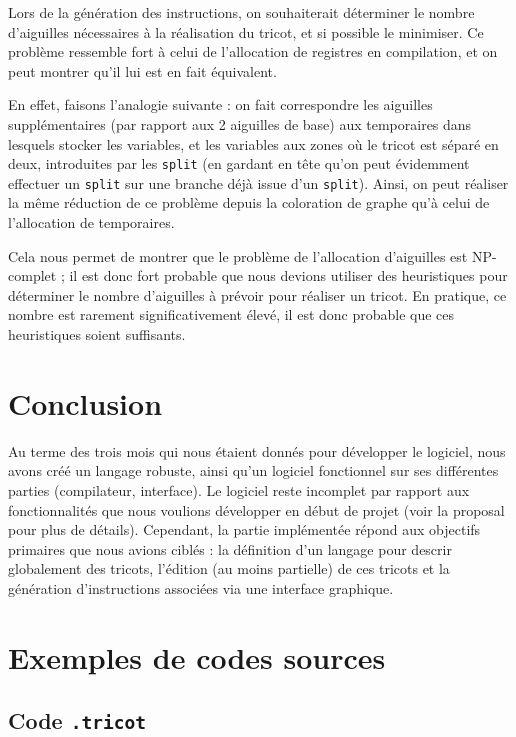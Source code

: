 \documentclass{article}
\begin{document}
Lors de la génération des instructions, on souhaiterait déterminer le nombre d'aiguilles nécessaires à la réalisation du tricot, 
et si possible le minimiser. Ce problème ressemble fort à celui de l'allocation de registres en compilation, et on peut montrer 
qu'il lui est en fait équivalent.

En effet, faisons l'analogie suivante : on fait correspondre les aiguilles supplémentaires (par rapport aux 2 aiguilles de base) 
aux temporaires dans lesquels stocker les variables, et les variables aux zones où le tricot est séparé en deux, introduites par 
les \texttt{split} (en gardant en tête qu'on peut évidemment effectuer un \texttt{split} sur une branche déjà issue d'un 
\texttt{split}). Ainsi, on peut réaliser la même réduction de ce problème depuis la coloration de graphe qu'à celui de l'allocation 
de temporaires.

Cela nous permet de montrer que le problème de l'allocation d'aiguilles est \textsc{NP}-complet ; il est donc fort probable 
que nous devions utiliser des heuristiques pour déterminer le nombre d'aiguilles à prévoir pour réaliser un tricot. En pratique,
ce nombre est rarement significativement élevé, il est donc probable que ces heuristiques soient suffisants.

\section*{Conclusion}

Au terme des trois mois qui nous étaient donnés pour développer le logiciel, nous avons créé un langage robuste, ainsi qu'un 
logiciel fonctionnel sur ses différentes parties (compilateur, interface). Le logiciel reste incomplet par rapport aux 
fonctionnalités que nous voulions développer en début de projet (voir la proposal pour plus de détails). Cependant, la partie implémentée
répond aux objectifs primaires que nous avions ciblés : 
la définition d'un langage pour descrir globalement des tricots, l'édition (au moins partielle) de ces tricots et 
la génération d'instructions associées via une interface graphique.

\newpage

\appendix

\section{Exemples de codes sources}

\subsection{Code \texttt{.tricot}}
\end{document}
